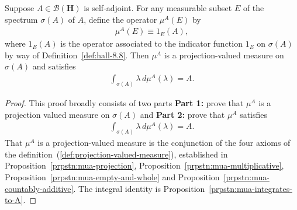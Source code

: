 \begin{theorem}
    \label{thrm:hall-8.10}
    \leanok
    Suppose $A \in \mathcal{B}(\mathbf{H})$ is self-adjoint. For any measurable subset $E$ of the spectrum $\sigma(A)$ of $A$, define the operator $\mu^A(E)$ by
    \begin{align}
        \mu^A(E) \equiv 1_E(A),
    \end{align}
    where $1_E(A)$ is the operator associated to the indicator function $1_E$ on $\sigma(A)$ by way of Definition~\ref{def:hall-8.8}. Then $\mu^A$ is a projection-valued measure on $\sigma(A)$ and satisfies
    \begin{align}
        \int_{\sigma(A)} \lambda \, d\mu^A(\lambda) = A.
    \end{align}
\end{theorem}
\begin{proof}
    \leanok
This proof broadly consists of two parts \textbf{Part 1:} prove that $\mu^A$ is a projection valued measure on $\sigma(A)$ and \textbf{Part 2:} prove that $\mu^A$ satisfies
\begin{align}
    \int_{\sigma(A)} \lambda \, d\mu^A(\lambda) = A.
\end{align}
That $\mu^A$ is a projection-valued measure is the conjunction of the four axioms of the definition~(\ref{def:projection-valued-measure}), established in Proposition~\ref{prpstn:mua-projection}, Proposition~\ref{prpstn:mua-multiplicative}, Proposition~\ref{prpstn:mua-empty-and-whole} and Proposition~\ref{prpstn:mua-countably-additive}. The integral identity is Proposition~\ref{prpstn:mua-integrates-to-A}.
\end{proof}

